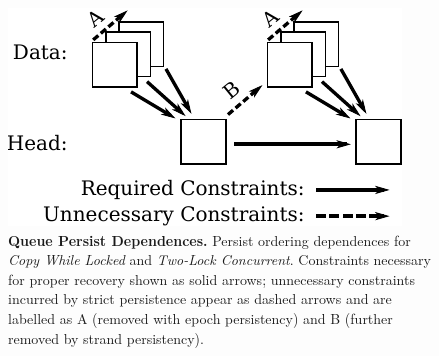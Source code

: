 \begin{figure}
  \centering
  \includegraphics[width=.55\linewidth]{PersistencyModels/CWL_2LC_dependences.pdf}
  \caption{\textbf{Queue Persist Dependences.} Persist ordering dependences for \emph{Copy While Locked} and \emph{Two-Lock Concurrent}.  Constraints necessary for proper recovery shown as solid arrows; unnecessary constraints incurred by strict persistence appear as dashed arrows and are labelled as A (removed with epoch persistency) and B (further removed by strand persistency).}
  \label{fig::CWL_dependences}
\end{figure}
